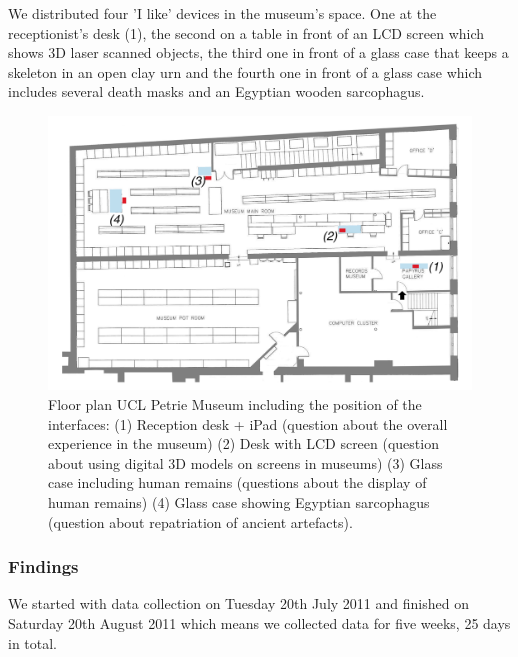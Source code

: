 We distributed four 'I like' devices in the museum's space. One at the receptionist's desk (1), the second on a table in front of an LCD screen which shows 3D laser scanned objects, the third one in front of a glass case that keeps a skeleton in an open clay urn and the fourth one in front of a glass case which includes several death masks and an Egyptian wooden sarcophagus. 

\begin{figure}[!h] 
\centering
\includegraphics[width=\textwidth]{Illustrations/petrie_layout.png}
\caption [Floor plan UCL Petrie Museum] {Floor plan UCL Petrie Museum including the position of the interfaces: (1) Reception desk + iPad (question about the overall experience in the museum) (2) Desk with LCD screen (question about using digital 3D models on screens in museums) (3) Glass case including human remains (questions about the display of human remains) (4) Glass case showing Egyptian sarcophagus (question about repatriation of ancient artefacts).}
\label{interfaces}
\end{figure}


\subsubsection{Findings}

We started with data collection on Tuesday 20th July 2011 and finished on Saturday 20th August 2011 which means we collected data for five weeks, 25 days in total.

